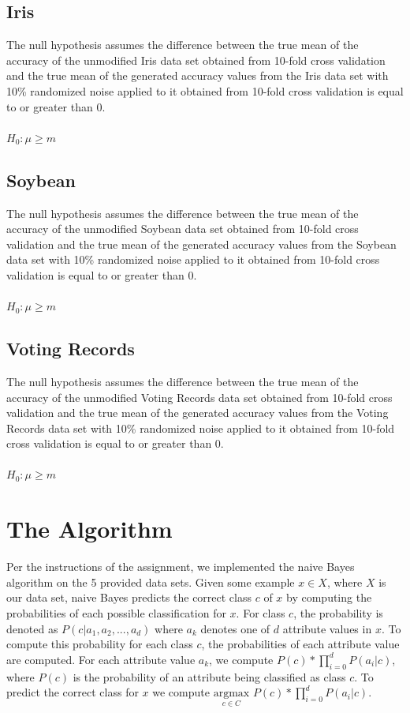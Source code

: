 \documentclass[twoside,11pt]{article}
\begin{document}
\subsection{Iris} The null hypothesis assumes the difference between the true mean of the accuracy of the unmodified Iris data set obtained from 10-fold cross validation and the true mean of the generated accuracy values from the Iris data set with 10\% randomized noise applied to it obtained from 10-fold cross validation is equal to or greater than 0.\\\\
$H_0 : \mu \geq m$

\subsection{Soybean} The null hypothesis assumes the difference between the true mean of the accuracy of the unmodified Soybean data set obtained from 10-fold cross validation and the true mean of the generated accuracy values from the Soybean data set with 10\% randomized noise applied to it obtained from 10-fold cross validation is equal to or greater than 0.\\\\
$H_0 : \mu \geq m$

\subsection{Voting Records} The null hypothesis assumes the difference between the true mean of the accuracy of the unmodified Voting Records data set obtained from 10-fold cross validation and the true mean of the generated accuracy values from the Voting Records data set with 10\% randomized noise applied to it obtained from 10-fold cross validation is equal to or greater than 0.\\\\
$H_0 : \mu \geq m$

\section{The Algorithm}
Per the instructions of the assignment, we implemented the naive Bayes algorithm on the 5 provided data sets. Given some example $x \in X$, where $X$ is our data set, naive Bayes predicts the correct class $c$ of $x$ by computing the probabilities of each possible classification for $x$. For class $c$, the probability is denoted as $P(c | a_1, a_2,...,a_d)$ where $a_k$ denotes one of $d$ attribute values in $x$. To compute this probability for each class $c$, the probabilities of each attribute value are computed. For each attribute value $a_k$, we compute $P(c) * \prod^d_{i=0} P(a_i | c)$, where $P(c)$ is the probability of an attribute being classified as class $c$. To predict the correct class for $x$ we compute $\underset{c \in C}{\mathrm{argmax}}$ $P(c) * \prod^d_{i=0} P(a_i | c)$.
\end{document}
